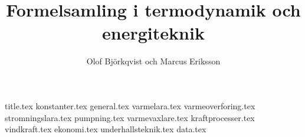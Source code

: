 \documentclass[a4paper,11pt,onecolumn,fleqn]{report}
\author{Olof Björkqvist och Marcus Eriksson}
\title{Formelsamling i termodynamik och energiteknik}
\begin{document}
{title.tex}
\tableofcontents
\setlength\LTleft{0 cm}
{konstanter.tex}
{general.tex}
{varmelara.tex}
{varmeoverforing.tex}
{stromningslara.tex}
{pumpning.tex}
{varmevaxlare.tex}
{kraftprocesser.tex}
{vindkraft.tex}
{ekonomi.tex}
{underhallsteknik.tex}
{data.tex}
\cleardoublepage
\printglossary[title=Symboler, toctitle=Symboler, type=\acronymtype]
\cleardoublepage
{}
\printbibliography
\end{document}
